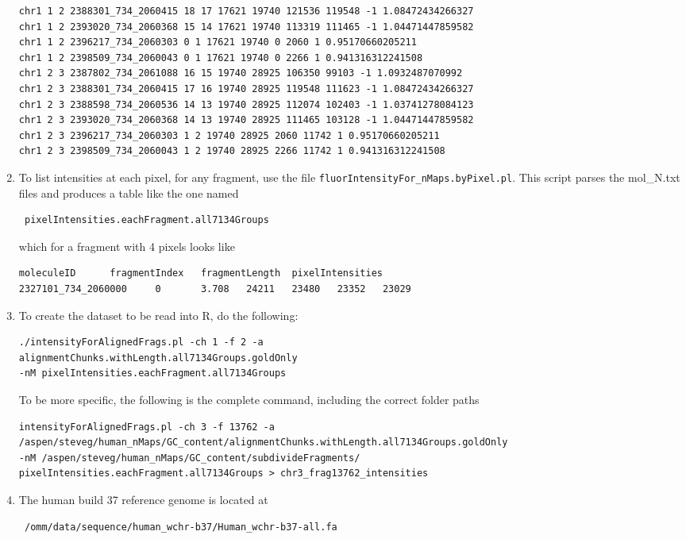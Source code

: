 \documentclass[11pt]{article}
\begin{document}
\begin{enumerate}
\begin{verbatim}
chr1 1 2 2388301_734_2060415 18 17 17621 19740 121536 119548 -1 1.08472434266327
chr1 1 2 2393020_734_2060368 15 14 17621 19740 113319 111465 -1 1.04471447859582
chr1 1 2 2396217_734_2060303 0 1 17621 19740 0 2060 1 0.95170660205211
chr1 1 2 2398509_734_2060043 0 1 17621 19740 0 2266 1 0.941316312241508
chr1 2 3 2387802_734_2061088 16 15 19740 28925 106350 99103 -1 1.0932487070992
chr1 2 3 2388301_734_2060415 17 16 19740 28925 119548 111623 -1 1.08472434266327
chr1 2 3 2388598_734_2060536 14 13 19740 28925 112074 102403 -1 1.03741278084123
chr1 2 3 2393020_734_2060368 14 13 19740 28925 111465 103128 -1 1.04471447859582
chr1 2 3 2396217_734_2060303 1 2 19740 28925 2060 11742 1 0.95170660205211
chr1 2 3 2398509_734_2060043 1 2 19740 28925 2266 11742 1 0.941316312241508
\end{verbatim}
\item
To list intensities at each pixel, for any fragment, use the file \texttt{fluorIntensityFor\_nMaps.byPixel.pl}. This script parses the mol\_N.txt files and produces a table like the one named \begin{verbatim} pixelIntensities.eachFragment.all7134Groups \end{verbatim}
which for a fragment with 4 pixels looks like
\begin{verbatim}
moleculeID      fragmentIndex   fragmentLength  pixelIntensities
2327101_734_2060000     0       3.708   24211   23480   23352   23029
\end{verbatim}
\item
To create the dataset to be read into R, do the following:\\
\begin{verbatim}
./intensityForAlignedFrags.pl -ch 1 -f 2 -a 
alignmentChunks.withLength.all7134Groups.goldOnly 
-nM pixelIntensities.eachFragment.all7134Groups
\end{verbatim}
To be more specific, the following is the complete command, including the correct folder paths
\begin{verbatim}
intensityForAlignedFrags.pl -ch 3 -f 13762 -a 
/aspen/steveg/human_nMaps/GC_content/alignmentChunks.withLength.all7134Groups.goldOnly 
-nM /aspen/steveg/human_nMaps/GC_content/subdivideFragments/
pixelIntensities.eachFragment.all7134Groups > chr3_frag13762_intensities
\end{verbatim}

\item
The human build 37 reference genome is located at \begin{verbatim} /omm/data/sequence/human_wchr-b37/Human_wchr-b37-all.fa \end{verbatim}


\end{enumerate}
\end{document}
